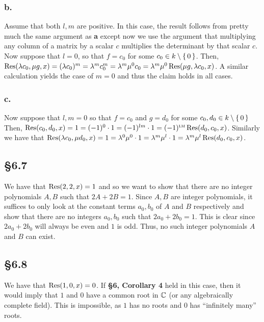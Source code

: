 \documentclass[letterpaper]{article}
\begin{document}
\subsubsection*{b.}

Assume that both $l, m$ are positive.
In this case, the result follows from pretty much the same argument as \textbf{a} except now we use the argument that multiplying any column of a matrix by a scalar $c$ multiplies the determinant by that scalar $c$.
Now suppose that $l = 0$, so that $f = c_{0}$ for some $c_{0} \in k \setminus \set{0}$.
Then, $\Res(\lambda c_{0}, \mu g, x) = (\lambda c_{0})^{m} = \lambda^{m} c_{0}^{m} = \lambda^{m} \mu^{0} c_{0} = \lambda^{m} \mu^{0} \Res(\mu g, \lambda c_{0}, x)$.
A similar calculation yields the case of $m = 0$ and thus the claim holds in all cases.

\subsubsection*{c.}

Now suppose that $l, m = 0$ so that $f = c_{0}$ and $g = d_{0}$ for some $c_{0}, d_{0} \in k \setminus \set{0}$
Then, $\Res(c_{0}, d_{0}, x) = 1 = (-1)^{0} \cdot 1 = (-1)^{lm} \cdot 1 = (-1)^{\lm} \Res(d_{0}, c_{0}, x)$.
Similarly we have that $\Res(\lambda c_{0}, \mu d_{0}, x) = 1 = \lambda^{0} \mu^{0} \cdot 1 = \lambda^{m} \mu^{l} \cdot 1 = \lambda^{m} \mu^{l} \Res(d_{0}, c_{0}, x)$.

\subsection*{\S 6.7}

We have that $\Res(2, 2, x) = 1$ and so we want to show that there are no integer polynomials $A, B$ such that $2A + 2B = 1$.
Since $A, B$ are integer polynomials, it suffices to only look at the constant terms $a_{0}, b_{0}$ of $A$ and $B$ respectively and show that there are no integers $a_{0}, b_{0}$ such that $2a_{0} + 2b_{0} = 1$.
This is clear since $2a_{0} + 2b_{0}$ will always be even and $1$ is odd.
Thus, no such integer polynomials $A$ and $B$ can exist.

\subsection*{\S 6.8}

We have that $\Res(1, 0, x) = 0$.
If \textbf{\S 6, Corollary 4} held in this case, then it would imply that $1$ and $0$ have a common root in $\mathbb{C}$ (or any algebraically complete field).
This is impossible, as $1$ has no roots and $0$ has ``infinitely many'' roots.



\printbibliography
\end{document}
